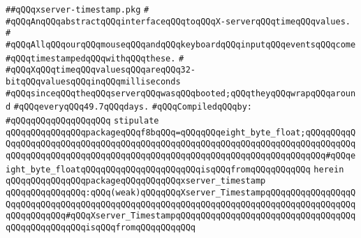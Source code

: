 \label{src/lib/x-kit/xclient/src/wire/xserver-timestamp.pkg}
\verb|##qQQqxserver-timestamp.pkg|\newline
\verb|#|\newline
\verb|#qQQqAnqQQqabstractqQQqinterfaceqQQqtoqQQqX-serverqQQqtimeqQQqvalues.|\newline
\verb|#|\newline
\verb|#qQQqAllqQQqourqQQqmouseqQQqandqQQqkeyboardqQQqinputqQQqeventsqQQqcome|\newline
\verb|#qQQqtimestampedqQQqwithqQQqthese.|\newline
\verb|#|\newline
\verb|#qQQqXqQQqtimeqQQqvaluesqQQqareqQQq32-bitqQQqvaluesqQQqinqQQqmilliseconds|\newline
\verb|#qQQqsinceqQQqtheqQQqserverqQQqwasqQQqbooted;qQQqtheyqQQqwrapqQQqaround|\newline
\verb|#qQQqeveryqQQq49.7qQQqdays.|\newline
\newline
\verb|#qQQqCompiledqQQqby:|\newline
\verb|#qQQqqQQqqQQqqQQqqQQq|\newline
\newline
\newline
\newline
\newline
\verb|stipulate|\newline
\verb|qQQqqQQqqQQqqQQqpackageqQQqf8bqQQq=qQQqqQQqeight_byte_float;qQQqqQQqqQQqqQQqqQQqqQQqqQQqqQQqqQQqqQQqqQQqqQQqqQQqqQQqqQQqqQQqqQQqqQQqqQQqqQQqqQQqqQQqqQQqqQQqqQQqqQQqqQQqqQQqqQQqqQQqqQQqqQQqqQQqqQQqqQQqqQQq#qQQqeight_byte_floatqQQqqQQqqQQqqQQqqQQqqQQqisqQQqfromqQQqqQQqqQQq|\newline
\verb|herein|\newline
\newline
\verb|qQQqqQQqqQQqqQQqpackageqQQqqQQqqQQqxserver_timestamp|\newline
\verb|qQQqqQQqqQQqqQQq:qQQq(weak)qQQqqQQqXserver_TimestampqQQqqQQqqQQqqQQqqQQqqQQqqQQqqQQqqQQqqQQqqQQqqQQqqQQqqQQqqQQqqQQqqQQqqQQqqQQqqQQqqQQqqQQqqQQqqQQqqQQq#qQQqXserver_TimestampqQQqqQQqqQQqqQQqqQQqqQQqqQQqqQQqqQQqqQQqqQQqqQQqqQQqisqQQqfromqQQqqQQqqQQq|\newline
